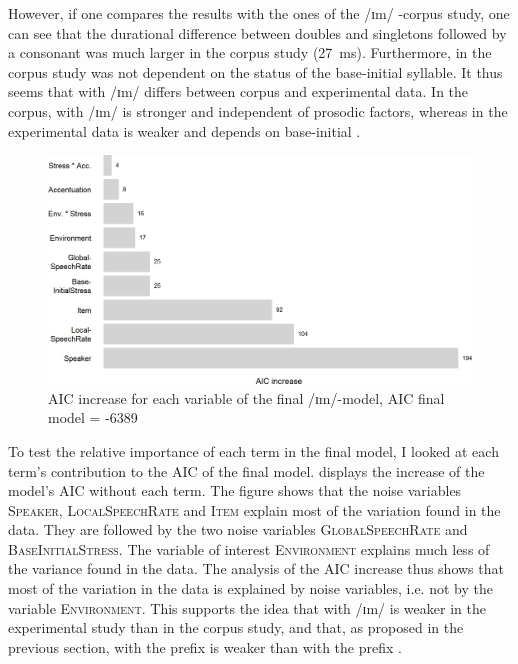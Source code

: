 However, if one compares the results with the ones of the /ɪm/ -corpus study, one can see that the durational difference between doubles and singletons followed by a consonant was much larger in the corpus study (27~ms). Furthermore, in the corpus study  was not dependent on the  status of the base-initial syllable.
It thus seems that  with /ɪm/  differs between corpus and experimental data. In the corpus,  with /ɪm/  is stronger and independent of prosodic factors, whereas in the experimental data  is weaker and depends on base-initial .


 









\begin{figure}
	
	\includegraphics[scale=0.7]{images/Experiment/AICdecreaseImComplex.png}
	\caption{AIC increase for each variable of the final /ɪm/-model, AIC final model = -6389}
	\label{fig:Effectsize im experiment}
	
\end{figure}

To test the relative importance of each term in the final model, I looked at each term's contribution to the AIC of the final model.  displays the increase of the model's AIC  without each term. 
The figure shows that the noise variables \textsc{Speaker}, \textsc{LocalSpeechRate} and \textsc{Item} explain  most of the variation found in the data. They are followed by the two noise variables \textsc{GlobalSpeechRate} and \textsc{BaseInitialStress}. The variable of interest \textsc{Environment} explains much less of the variance found in the data. The analysis of the AIC increase thus shows that most of the variation in the data is explained by noise variables, i.e. not by the variable \textsc{Environment}. This supports the idea that  with /ɪm/  is weaker in the experimental study than in the corpus study, and that, as proposed in the previous section,  with the prefix  is weaker than  with the prefix  . 




